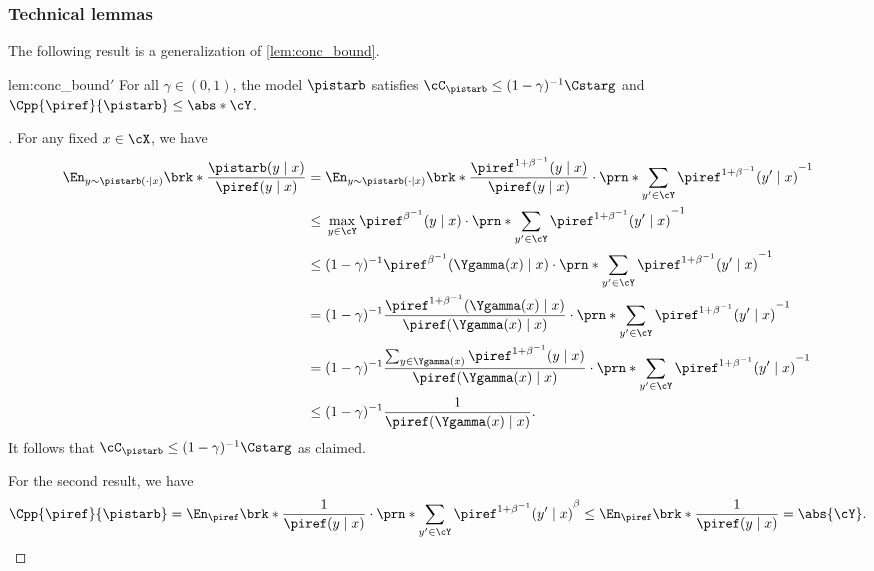 \subsubsection{Technical lemmas}

The following result is a generalization of \cref{lem:conc_bound}.

\begin{lemmod}{lem:conc_bound}{$'$}
  \label{lem:conc_bound_general}
  For all $\gamma\in(0,1)$, the model $\pistarb$ satisfies $\cC_{\pistarb} \leq (1-\gamma)^{-1}\Cstarg$ and $\Cpp{\piref}{\pistarb} \leq{} \abs*{\cY}$.
\end{lemmod}
\begin{proof}[]%
  \newcommand{\ystarg}{\ystar_{\gamma}}
  For any fixed $x \in \cX$, we have 
    \begin{align}
      \En_{y \sim \pistarb(\cdot\mid x)}\brk*{\frac{\pistarb(y\mid x)}{\piref(y\mid x)}}
      &= \En_{y \sim \pistarb(\cdot\mid x)}\brk*{
      \frac{\piref^{1+\beta^{-1}}(y\mid{}x)}{\piref(y\mid{}x)}
        }\cdot{}\prn*{\sum_{y'\in\cY}\piref^{1+\beta^{-1}}(y'\mid{}x)}^{-1}\\
      &\leq{} 
        \max_{y\in\cY}\piref^{\beta^{-1}}(y\mid{}x)
        \cdot{}\prn*{\sum_{y'\in\cY}\piref^{1+\beta^{-1}}(y'\mid{}x)}^{-1}\\
            &\leq{} 
              (1-\gamma)^{-1}\piref^{\beta^{-1}}(\Ygamma(x)\mid{}x)
              \cdot{}\prn*{\sum_{y'\in\cY}\piref^{1+\beta^{-1}}(y'\mid{}x)}^{-1}\\
                  &=
              (1-\gamma)^{-1}\frac{\piref^{1+\beta^{-1}}(\Ygamma(x)\mid{}x)}{\piref(\Ygamma(x)\mid{}x)}
        \cdot{}\prn*{\sum_{y'\in\cY}\piref^{1+\beta^{-1}}(y'\mid{}x)}^{-1}\\
      &= 
        (1-\gamma)^{-1}\frac{\sum_{y\in\Ygamma(x)}\piref^{1+\beta^{-1}}(y\mid{}x)}{\piref(\Ygamma(x)\mid{}x)}
        \cdot{}\prn*{\sum_{y'\in\cY}\piref^{1+\beta^{-1}}(y'\mid{}x)}^{-1}\\
      &\leq
        (1-\gamma)^{-1}\frac{1}{\piref(\Ygamma(x)\mid{}x)}.
    \end{align}
    It follows that
    $\cC_{\pistarb} \leq (1-\gamma)^{-1}\Cstarg$
        as claimed.
    
For the second result, we have
  \begin{align}
    \Cpp{\piref}{\pistarb}
    =\En_{\piref}\brk*{\frac{1}{\piref(y\mid{}x)}\cdot\prn*{\sum_{y'\in\cY}\piref^{1+\beta^{-1}}(y'\mid{}x)}^{\beta}}
    \leq{}\En_{\piref}\brk*{\frac{1}{\piref(y\mid{}x)}}=\abs{\cY}.
  \end{align}
\end{proof}

